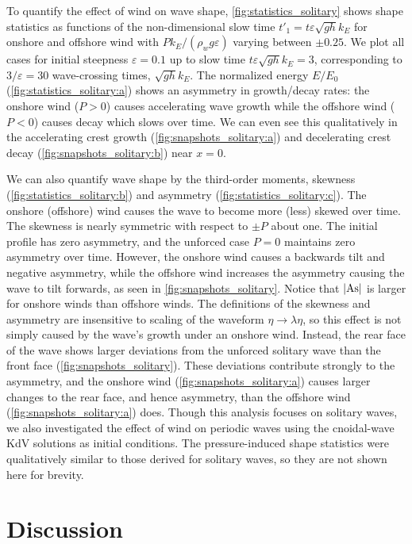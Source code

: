 \documentclass{jfm}
\DeclareMathOperator{\As}{As}
\renewcommand*{\epsilon}{\varepsilon}
\begin{document}
To quantify the effect of wind on wave shape,
\cref{fig:statistics_solitary} shows shape statistics as functions of
the non-dimensional slow time $t'_1 = t \epsilon \sqrt{g h} k_E$ for
onshore and offshore wind with $P k_E/(\rho_w g \epsilon)$ varying
between $\pm 0.25$.
We plot all cases for initial steepness $\epsilon = 0.1$ up to slow time
$t \epsilon \sqrt{g h} k_E = 3$, corresponding to $3/\epsilon = 30$
wave-crossing times, $\sqrt{gh} k_E$.
The normalized energy $E/E_0$ (\cref{fig:statistics_solitary:a}) shows
an asymmetry in growth/decay rates: the onshore wind ($P>0$) causes
accelerating wave growth while the offshore wind ($P<0$) causes decay
which slows over time.
We can even see this qualitatively in the accelerating crest growth
(\cref{fig:snapshots_solitary:a}) and decelerating crest decay
(\cref{fig:snapshots_solitary:b}) near $x=0$.

We can also quantify wave shape by the third-order moments, skewness
(\cref{fig:statistics_solitary:b}) and asymmetry
(\cref{fig:statistics_solitary:c}).
The onshore (offshore) wind causes the wave to become more (less) skewed
over time.
The skewness is nearly symmetric with respect to $\pm P$ about one.
The initial profile has zero asymmetry, and the unforced case
$P=0$ maintains zero asymmetry over time.
However, the onshore wind causes a backwards tilt and negative
asymmetry, while the offshore wind increases the asymmetry causing the
wave to tilt forwards, as seen in \cref{fig:snapshots_solitary}.
Notice that $\abs{\As}$ is larger for onshore winds than offshore winds.
The definitions of the skewness and asymmetry are insensitive to scaling
of the waveform $\eta \to \lambda \eta$, so this effect is not simply
caused by the wave's growth under an onshore wind.
Instead, the rear face of the wave shows larger deviations from the
unforced solitary wave than the front face
(\cref{fig:snapshots_solitary}).
These deviations contribute strongly to the asymmetry, and the onshore
wind (\cref{fig:snapshots_solitary:a}) causes larger changes to the rear
face, and hence asymmetry, than the offshore wind
(\cref{fig:snapshots_solitary:a}) does.
Though this analysis focuses on solitary waves, we also investigated the
effect of wind on periodic waves using the cnoidal-wave KdV solutions as
initial conditions.
The pressure-induced shape statistics were qualitatively similar to
those derived for solitary waves, so they are not shown here for
brevity.

\section{\label{sec:discussion} Discussion}
\end{document}
